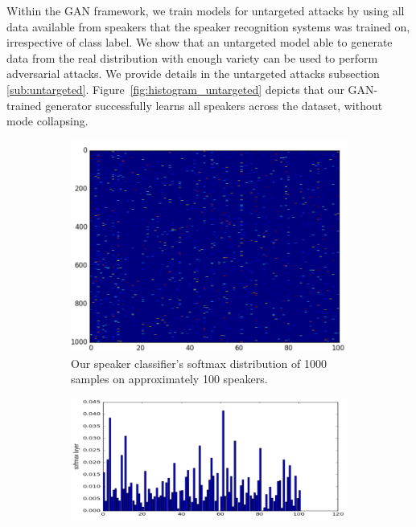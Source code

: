 Within the GAN framework, we train models for untargeted attacks by using all
data available from speakers that the speaker recognition systems was trained on, 
irrespective of class label. We show that an untargeted model able to generate 
data from the real distribution with enough variety can be used to perform 
adversarial attacks. We provide details in the untargeted attacks 
subsection \ref{sub:untargeted}. Figure~\ref{fig:histogram_untargeted} depicts
that our GAN-trained generator successfully learns all speakers across the
dataset, without mode collapsing.
\begin{figure}[t]
    \centering
    \begin{subfigure}[b]{0.4\textwidth}
        \includegraphics[width=\textwidth]{./fig/conf_mat_untargeted.png}
        \caption{Our speaker classifier's softmax distribution of 1000 samples 
        on approximately 100 speakers.}
        \label{fig:cm_softmax_untargeted}
    \end{subfigure}
    \qquad
    \begin{subfigure}[b]{0.4\textwidth}
        \includegraphics[width=\textwidth]{./fig/histogram_untargeted.png}

\end{subfigure}
\end{figure}
